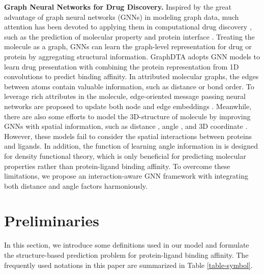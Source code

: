 \documentclass[sigconf]{acmart}
\begin{document}
{\bfseries Graph Neural Networks for Drug Discovery.}
Inspired by the great advantage of graph neural networks (GNNs) in modeling graph data, much attention has been devoted to applying them in computational drug discovery \cite{sun2020graph}, such as the prediction of molecular property \cite{hao2020asgn} and protein interface \cite{liu2020deep}. Treating the molecule as a graph, GNNs can learn the graph-level representation for drug or protein by aggregating structural information. GraphDTA \cite{10.1093/bioinformatics/btaa921} adopts GNN models \cite{kipf2017semi,velivckovic2018graph,xu2018powerful} to learn drug presentation with combining the protein representation from 1D convolutions to predict binding affinity. In attributed molecular graphs, the edges between atoms contain valuable information, such as distance or bond order. To leverage rich attributes in the molecule, edge-oriented message passing neural networks \cite{yang2019analyzing,song2020communicative,zhou2020distance} are proposed to update both node and edge embeddings . Meanwhile, there are also some efforts to model the 3D-structure of molecule by improving GNNs with spatial information, such as distance \cite{lim2019predicting,maziarka2020molecule}, angle \cite{klicpera_dimenet_2020}, and 3D coordinate \cite{danel2020spatial}. However, these models fail to consider the spatial interactions between proteins and ligands. In addition, the function of learning angle information in \cite{klicpera_dimenet_2020} is designed for density functional theory, which is only beneficial for predicting molecular properties rather than protein-ligand binding affinity. To overcome these limitations, we propose an interaction-aware GNN framework with integrating both distance and angle factors harmoniously. \section{Preliminaries}\label{sec-pre}
In this section, we  introduce some definitions used in our model and formulate the structure-based prediction problem for protein-ligand binding affinity.  The frequently used notations in this paper are summarized in Table \ref{table-symbol}.
\end{document}
